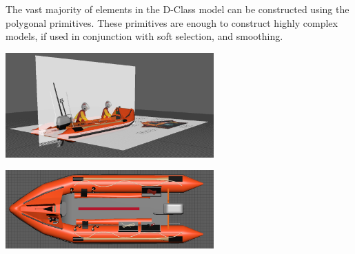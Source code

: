 \documentclass[ %
                    author={Elis Jones},
                supervisor={Dr. Kirsten Cater},
                    degree={BSc},
                     title={The Effect of Presentation Medium on Spatial Cognition},
                  subtitle={in the Virtual Environment},
                      year={2018} ]{dissertation}
\begin{document}
The vast majority of elements in the D-Class model can be constructed using the polygonal primitives. These primitives are enough to construct highly complex models, if used in conjunction with soft selection, and smoothing.

\begin{minipage}{\textwidth}
\hfill \break
\centering
\includegraphics[width=0.6\textwidth]{images/image_planes}
\label{image-plane}
\hfill \break
\end{minipage}

\begin{minipage}{\textwidth}
\hfill \break
\centering
\includegraphics[width=0.6\textwidth]{images/top_model}
\label{model}
\hfill \break
\end{minipage}
\end{document}
